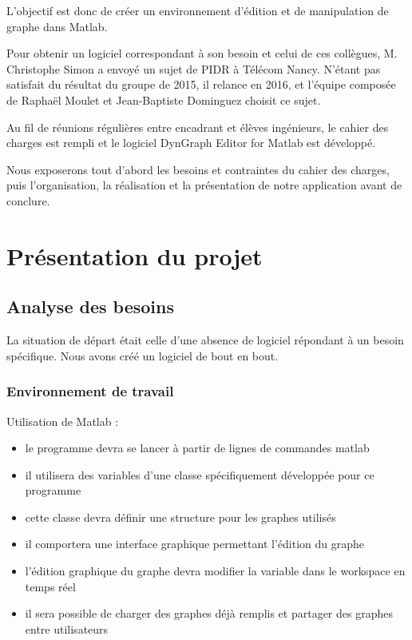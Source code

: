 \documentclass[pidr]{tnreport}
\begin{document}
L’objectif est donc de créer un environnement d’édition et de manipulation de graphe dans Matlab.

Pour obtenir un logiciel correspondant à son besoin et celui de ces collègues, M. Christophe Simon a envoyé un sujet de PIDR à Télécom Nancy. N’étant pas satisfait du résultat du groupe de 2015, il relance en 2016, et l’équipe composée de Raphaël Moulet et Jean-Baptiste Dominguez choisit ce sujet.

Au fil de réunions régulières entre encadrant et élèves ingénieurs, le cahier des charges est rempli et le logiciel DynGraph Editor for Matlab est développé.

Nous exposerons tout d’abord les besoins et contraintes du cahier des charges, puis l’organisation, la réalisation et la présentation de notre application avant de conclure.

\cleardoublepage

\chapter{Présentation du projet}

\section{Analyse des besoins}

La situation de départ était celle d’une absence de logiciel répondant à un besoin spécifique. Nous avons créé un logiciel de bout en bout.

\subsection{Environnement de travail}

Utilisation de Matlab : 

\begin{itemize}
\item le programme devra se lancer à partir de lignes de commandes matlab
\item il utilisera des variables d’une classe spécifiquement développée pour  ce programme
\item cette classe devra définir une structure pour les graphes utilisés
\item il comportera une interface graphique permettant l’édition du graphe
\item l’édition graphique du graphe devra modifier la variable dans le workspace en temps réel
\item il sera possible de charger des graphes déjà remplis et partager des graphes entre utilisateurs
\end{itemize}
\end{document}
